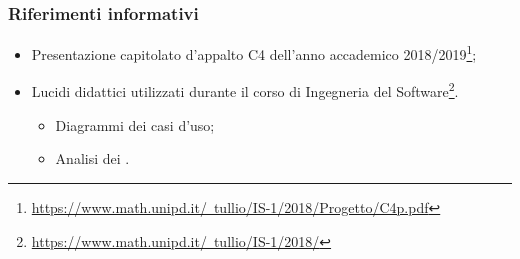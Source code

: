 \subsubsection{Riferimenti informativi}
\begin{itemize}
	\item Presentazione capitolato d’appalto C4 dell'anno accademico 2018/2019\footnote{\href{https://www.math.unipd.it/~tullio/IS-1/2018/Progetto/C4p.pdf}{https://www.math.unipd.it/~tullio/IS-1/2018/Progetto/C4p.pdf}};
	\item Lucidi didattici utilizzati durante il corso di Ingegneria del Software\footnote{\href{https://www.math.unipd.it/~tullio/IS-1/2018/}{https://www.math.unipd.it/~tullio/IS-1/2018/}}.
	\begin{itemize}
		\item Diagrammi dei casi d’uso;
		\item Analisi dei .
	\end{itemize}
\end{itemize}
